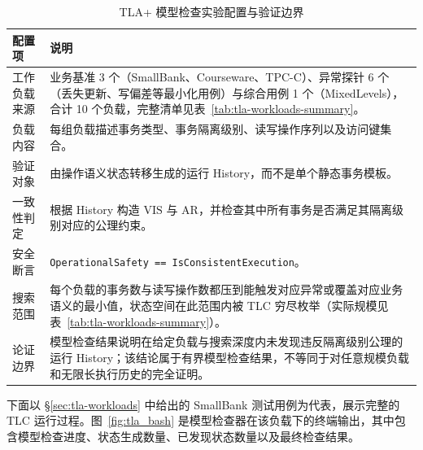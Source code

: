 \begin{table}[htbp]
    \centering
    \caption{TLA+ 模型检查实验配置与验证边界}
    \label{tab:tla_verification_config}
    \small
    \renewcommand{\arraystretch}{1.28}
    \begin{tabularx}{\textwidth}{lX}
        \toprule
        配置项    & 说明                                                                                                                                    \\
        \midrule
        工作负载来源 & 业务基准 3 个（SmallBank、Courseware、TPC-C）、异常探针 6 个（丢失更新、写偏差等最小化用例）与综合用例 1 个（MixedLevels），合计 10 个负载，完整清单见表~\ref{tab:tla-workloads-summary}。 \\
        \midrule
        负载内容   & 每组负载描述事务类型、事务隔离级别、读写操作序列以及访问键集合。                                                                                                      \\
        \midrule
        验证对象   & 由操作语义状态转移生成的运行 History，而不是单个静态事务模板。                                                                                                   \\
        \midrule
        一致性判定  & 根据 History 构造 $\mathrm{VIS}$ 与 $\mathrm{AR}$，并检查其中所有事务是否满足其隔离级别对应的公理约束。                                                               \\
        \midrule
        安全断言   & \texttt{OperationalSafety == IsConsistentExecution}。                                                                                  \\
        \midrule
        搜索范围   & 每个负载的事务数与读写操作数都压到能触发对应异常或覆盖对应业务语义的最小值，状态空间在此范围内被 TLC 穷尽枚举（实际规模见表~\ref{tab:tla-workloads-summary}）。                                    \\
        \midrule
        论证边界   & 模型检查结果说明在给定负载与搜索深度内未发现违反隔离级别公理的运行 History；该结论属于有界模型检查结果，不等同于对任意规模负载和无限长执行历史的完全证明。                                                     \\
        \bottomrule
    \end{tabularx}
\end{table}

下面以 §\ref{sec:tla-workloads} 中给出的 SmallBank 测试用例为代表，展示完整的 TLC 运行过程。图~\ref{fig:tla_bash} 是模型检查器在该负载下的终端输出，其中包含模型检查进度、状态生成数量、已发现状态数量以及最终检查结果。

